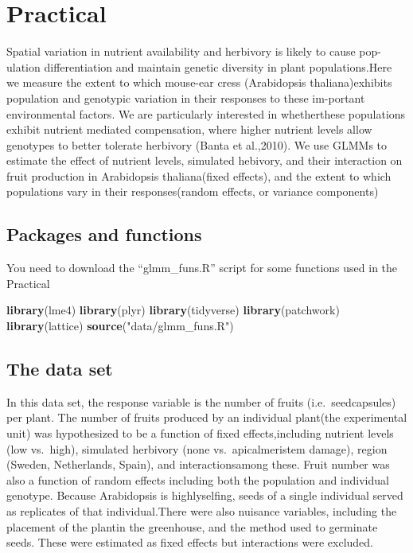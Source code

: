 \documentclass[
  12pt,
]{book}
\newenvironment{Shaded}{\begin{snugshade}}{\end{snugshade}}
\newcommand{\KeywordTok}[1]{\textcolor[rgb]{0.13,0.29,0.53}{\textbf{#1}}}
\newcommand{\NormalTok}[1]{#1}
\newcommand{\StringTok}[1]{\textcolor[rgb]{0.31,0.60,0.02}{#1}}
\begin{document}
\hypertarget{practical-3}{%
\section{Practical}\label{practical-3}}

Spatial variation in nutrient availability and herbivory is likely to cause pop-ulation differentiation and maintain genetic diversity in plant populations.Here we measure the extent to which mouse-ear cress (Arabidopsis thaliana)exhibits population and genotypic variation in their responses to these im-portant environmental factors. We are particularly interested in whetherthese populations exhibit nutrient mediated compensation, where higher nutrient levels allow genotypes to better tolerate herbivory (Banta et al.,2010). We use GLMMs to estimate the effect of nutrient levels, simulated hebivory, and their interaction on fruit production in Arabidopsis thaliana(fixed effects), and the extent to which populations vary in their responses(random effects, or variance components)

\hypertarget{packages-and-functions}{%
\subsection{Packages and functions}\label{packages-and-functions}}

You need to download the ``glmm\_funs.R'' script for some functions used in the Practical

\begin{Shaded}
\begin{Highlighting}[]
\KeywordTok{library}\NormalTok{(lme4)}
\KeywordTok{library}\NormalTok{(plyr)}
\KeywordTok{library}\NormalTok{(tidyverse)}
\KeywordTok{library}\NormalTok{(patchwork)}
\KeywordTok{library}\NormalTok{(lattice)}
\KeywordTok{source}\NormalTok{(}\StringTok{"data/glmm_funs.R"}\NormalTok{)}
\end{Highlighting}
\end{Shaded}

\hypertarget{the-data-set}{%
\subsection{The data set}\label{the-data-set}}

In this data set, the response variable is the number of fruits (i.e.~seedcapsules) per plant. The number of fruits produced by an individual plant(the experimental unit) was hypothesized to be a function of fixed effects,including nutrient levels (low vs.~high), simulated herbivory (none vs.~apicalmeristem damage), region (Sweden, Netherlands, Spain), and interactionsamong these. Fruit number was also a function of random effects including both the population and individual genotype. Because Arabidopsis is highlyselfing, seeds of a single individual served as replicates of that individual.There were also nuisance variables, including the placement of the plantin the greenhouse, and the method used to germinate seeds. These were estimated as fixed effects but interactions were excluded.
\end{document}
